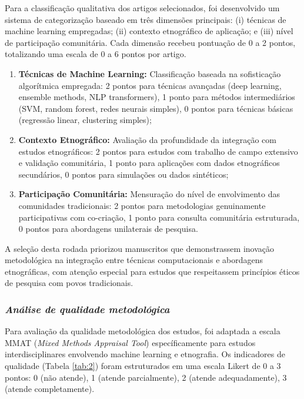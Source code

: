 Para a classificação qualitativa dos artigos selecionados, foi desenvolvido um sistema de categorização baseado em três dimensões principais: (i) técnicas de machine learning empregadas; (ii) contexto etnográfico de aplicação; e (iii) nível de participação comunitária. Cada dimensão recebeu pontuação de 0 a 2 pontos, totalizando uma escala de 0 a 6 pontos por artigo.

\begin{enumerate}[label=(\alph*)]
\item \textbf{Técnicas de Machine Learning:} Classificação baseada na sofisticação algorítmica empregada: 2 pontos para técnicas avançadas (deep learning, ensemble methods, NLP transformers), 1 ponto para métodos intermediários (SVM, random forest, redes neurais simples), 0 pontos para técnicas básicas (regressão linear, clustering simples);

\item \textbf{Contexto Etnográfico:} Avaliação da profundidade da integração com estudos etnográficos: 2 pontos para estudos com trabalho de campo extensivo e validação comunitária, 1 ponto para aplicações com dados etnográficos secundários, 0 pontos para simulações ou dados sintéticos;

\item \textbf{Participação Comunitária:} Mensuração do nível de envolvimento das comunidades tradicionais: 2 pontos para metodologias genuinamente participativas com co-criação, 1 ponto para consulta comunitária estruturada, 0 pontos para abordagens unilaterais de pesquisa.
\end{enumerate}

A seleção desta rodada priorizou manuscritos que demonstrassem inovação metodológica na integração entre técnicas computacionais e abordagens etnográficas, com atenção especial para estudos que respeitassem princípios éticos de pesquisa com povos tradicionais.

\subsubsection*{\textit{Análise de qualidade metodológica}}

Para avaliação da qualidade metodológica dos estudos, foi adaptada a escala MMAT (\textit{Mixed Methods Appraisal Tool}) \cite{Hong2018} específicamente para estudos interdisciplinares envolvendo machine learning e etnografia. Os indicadores de qualidade (Tabela \ref{tab:2}) foram estruturados em uma escala Likert de 0 a 3 pontos: 0 (não atende), 1 (atende parcialmente), 2 (atende adequadamente), 3 (atende completamente).

